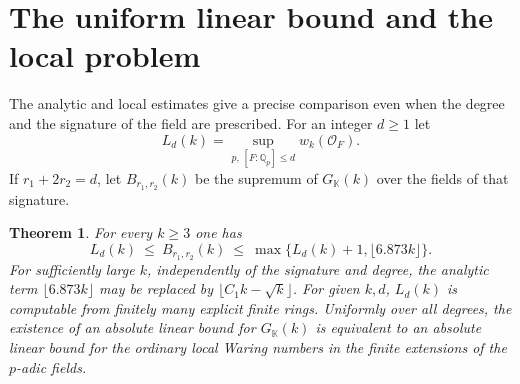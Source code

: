\documentclass[11pt,letterpaper]{article}
\newtheorem{theorem}{Theorem}[section]
\theoremstyle{definition}
\numberwithin{equation}{section}
\begin{document}
\section{The uniform linear bound and the local problem}
\label{sec:nf-global-envelope}
The analytic and local estimates give a precise comparison even when
the degree and the signature of the field are prescribed. For an
integer $d\ge1$ let
\[
 L_d(k)=\sup_{p,\,[F:\mathbb Q_p]\le d} w_k(\mathcal O_F).
\]
If $r_1+2r_2=d$, let $B_{r_1,r_2}(k)$ be the supremum of
$G_{\mathbb K}(k)$ over the fields of that signature.
\begin{theorem}\label{thm:nf-local-global-envelope}
For every $k\ge3$ one has
\[
 L_d(k)\ \le\ B_{r_1,r_2}(k)\ \le\
             \max\{L_d(k)+1,\lfloor6.873k\rfloor\}.
\]
For sufficiently large $k$, independently of the signature and degree,
the analytic term $\lfloor6.873k\rfloor$ may be replaced by
$\lfloor C_1 k-\sqrt k\rfloor$.
For given $k,d$, $L_d(k)$ is computable from finitely many explicit
finite rings. Uniformly over all degrees, the existence of an absolute
linear bound for $G_{\mathbb K}(k)$ is equivalent to an absolute
linear bound for the ordinary local Waring numbers in the finite
extensions of the $p$-adic fields.
\end{theorem}
\end{document}
